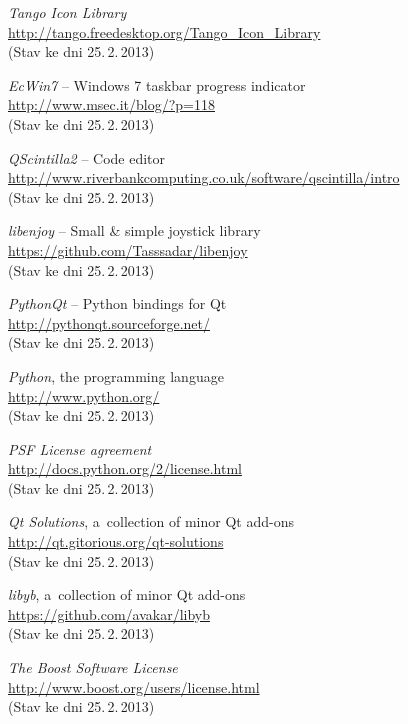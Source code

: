 \documentclass[12pt, a4paper, oneside]{article}
\newcommand{\It}{\textit}  %
\begin{document}
\begin{thebibliography}{99}
     \It{Tango Icon Library} \\
    \url{http://tango.freedesktop.org/Tango_Icon_Library}\\
    (Stav ke dni 25.\,2.\,2013)

     \It{EcWin7} -- Windows 7 taskbar progress indicator \\
    \url{http://www.msec.it/blog/?p=118}\\
    (Stav ke dni 25.\,2.\,2013)

     \It{QScintilla2} -- Code editor \\
    \url{http://www.riverbankcomputing.co.uk/software/qscintilla/intro}\\
    (Stav ke dni 25.\,2.\,2013)

     \It{libenjoy} -- Small & simple joystick library \\
    \url{https://github.com/Tasssadar/libenjoy}\\
    (Stav ke dni 25.\,2.\,2013)

     \It{PythonQt} -- Python bindings for Qt \\
    \url{http://pythonqt.sourceforge.net/}\\
    (Stav ke dni 25.\,2.\,2013)

     \It{Python}, the programming language \\
    \url{http://www.python.org/}\\
    (Stav ke dni 25.\,2.\,2013)

     \It{PSF License agreement} \\
    \url{http://docs.python.org/2/license.html}\\
    (Stav ke dni 25.\,2.\,2013)

     \It{Qt Solutions}, a~collection of minor Qt add-ons\\
    \url{http://qt.gitorious.org/qt-solutions}\\
    (Stav ke dni 25.\,2.\,2013)

     \It{libyb}, a~collection of minor Qt add-ons\\
    \url{https://github.com/avakar/libyb}\\
    (Stav ke dni 25.\,2.\,2013)

     \It{The Boost Software License} \\
    \url{http://www.boost.org/users/license.html}\\
    (Stav ke dni 25.\,2.\,2013)

\end{thebibliography}
\end{document}
